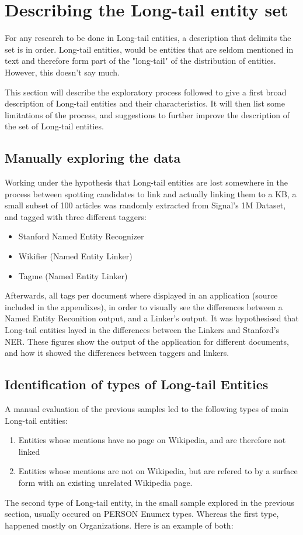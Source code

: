 \section{Describing the Long-tail entity set}
For any research to be done in Long-tail entities, a description that delimits the set is in order.
Long-tail entities, would be entities that are seldom mentioned in text and therefore form part of the "long-tail" of the distribution of entities.
However, this doesn't say much. 

This section will describe the exploratory process followed to give a first broad description of Long-tail entities and their characteristics.
It will then list some limitations of the process, and suggestions to further improve the description of the set of Long-tail entities.

\subsection{Manually exploring the data}
Working under the hypothesis that Long-tail entities are lost somewhere in the process between spotting candidates to link and actually linking them to a KB,
a small subset of 100 articles was randomly extracted from Signal's 1M Dataset, and tagged with three different taggers:
\begin{itemize}
\item Stanford Named Entity Recognizer\cite{rw_elo_finkel2005}
\item Wikifier (Named Entity Linker)\cite{wikifier_used}
\item Tagme (Named Entity Linker)\cite{tagme} 
\end{itemize}
Afterwards, all tags per document where displayed in an application (source included in the appendixes), in order to visually see the differences between a Named Entity Reconition output, and a Linker's output.
It was hypothesised that Long-tail entities layed in the differences between the Linkers and Stanford's NER.
These figures show the output of the application for different documents, and how it showed the differences between taggers and linkers.


\subsection{Identification of types of Long-tail Entities}
A manual evaluation of the previous samples led to the following types of main Long-tail entities:
\begin{enumerate}
\item Entities whose mentions have no page on Wikipedia, and are therefore not linked
\item Entities whose mentions are not on Wikipedia, but are refered to by a surface form with an existing unrelated Wikipedia page.
\end{enumerate}
The second type of Long-tail entity, in the small sample explored in the previous section, usually occured on PERSON Enumex types.
Whereas the first type, happened mostly on Organizations.
Here is an example of both:

